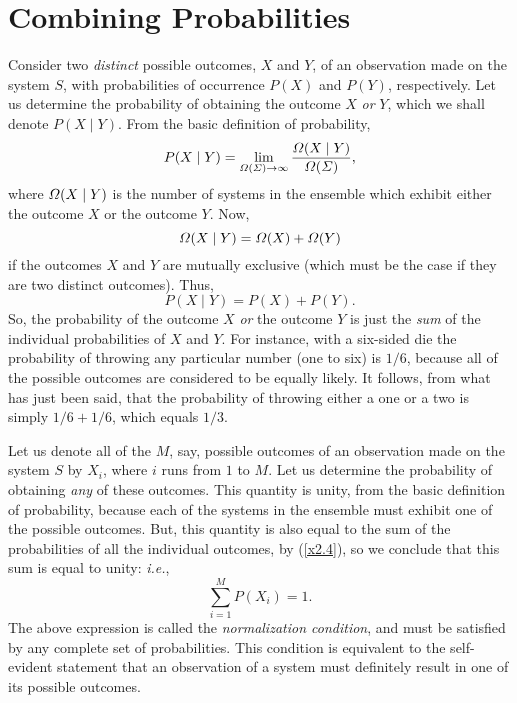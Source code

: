 \section{Combining Probabilities}
Consider two {\em distinct} possible outcomes, $X$ and $Y$, 
of an observation made on the system $S$, with probabilities of
occurrence  $P(X)$ and
$P(Y)$, respectively. Let us  determine the probability of
obtaining the outcome $X$ {\em or} $Y$, which we shall denote $P(X\mid Y)$.
From the basic definition of probability,
\begin{equation}
P(X\mid Y) =\lim_{{\mit\Omega}({\mit\Sigma})\rightarrow\infty}
\frac{
{\mit\Omega}(X \mid Y)}{{\mit\Omega}({\mit\Sigma})},
\end{equation}
where ${\mit\Omega}(X \mid Y)$ is the number of systems in the ensemble which exhibit
either the outcome $X$ or the outcome $Y$. Now, 
\begin{equation}
{\mit\Omega}(X\mid Y) = {\mit\Omega}(X) + {\mit\Omega}(Y)
\end{equation}
if the outcomes $X$ and $Y$ are mutually exclusive (which  must be the case
if they are two distinct outcomes). Thus,
\begin{equation}
P(X\mid Y) = P(X) + P(Y). \label{x2.4}
\end{equation}
So, the probability of the outcome $X$ {\em or} the outcome $Y$ is just the
{\em  sum}
of the individual probabilities of $X$ and $Y$. For instance, with  a 
six-sided die the probability of throwing any particular number (one to six) is
$1/6$, because all of the possible outcomes are considered to be equally
likely. It follows, from what  has just been said, that the probability of
throwing either a one or a two is simply  $1/6+1/6$, which equals $1/3$.

Let us denote all of the $M$, say,  possible outcomes of an observation
made on the system $S$ by
$X_i$, where $i$ runs from $1$ to $M$. Let us
determine  the probability of obtaining
{\em any}\/ of these outcomes. This quantity is  unity,
from the basic definition of probability, because each 
of the systems in the ensemble must
exhibit one of the possible outcomes. But, this quantity is also equal to
the sum of the probabilities of all the individual outcomes, by (\ref{x2.4}),
so we conclude that
this sum is equal to unity: {\em i.e.}, 
\begin{equation}
\sum_{i=1}^{M} P(X_i) =1.\label{x2.5}
\end{equation}
The above expression is called the {\em normalization condition}, and must be satisfied by
any complete set of probabilities. This condition is equivalent to the
self-evident statement that an observation of a system must definitely
result in one of its possible outcomes. 

